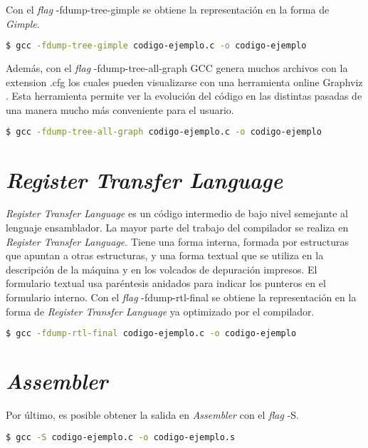 Con el \emph{flag} -fdump-tree-gimple se obtiene la representación en la forma de \emph{Gimple}.

\begin{lstlisting}[label=comandoC, caption= Comando de compilación para obtener codigo-ejemplo.c.006t.gimple \cite{repositorio} para GCC., language=bash]
    $ gcc -fdump-tree-gimple codigo-ejemplo.c -o codigo-ejemplo  \end{lstlisting}

Además, con el \emph{flag} -fdump-tree-all-graph GCC genera muchos archivos con la extension .cfg 
los cuales pueden visualizarse con una herramienta online Graphviz \cite{GraphvizOnline}. Esta herramienta permite 
ver la evolución del código en las distintas pasadas de una manera mucho más conveniente 
para el usuario. 

\begin{lstlisting}[label=comandoC, caption= Comando de compilación del archivo codigo-ejemplo.c \cite{repositorio} para GCC., language=bash]
    $ gcc -fdump-tree-all-graph codigo-ejemplo.c -o codigo-ejemplo  \end{lstlisting}


\section{\emph{Register Transfer Language}}

\emph{Register Transfer Language} es un código intermedio de bajo nivel semejante al lenguaje ensamblador.
La mayor parte del trabajo del compilador se realiza en \emph{Register Transfer Language}. Tiene una forma interna, 
formada por estructuras que apuntan a otras estructuras, y una forma textual 
que se utiliza en la descripción de la máquina y en los volcados de depuración 
impresos. El formulario textual usa paréntesis anidados para indicar los punteros en el formulario interno.
Con el \emph{flag} -fdump-rtl-final se obtiene la representación en la forma de \emph{Register Transfer Language} ya optimizado por el compilador.

\begin{lstlisting}[label=comandoC, caption= Comando de compilación para obtener codigo-ejemplo.c.330r.final \cite{repositorio} para GCC., language=bash]
    $ gcc -fdump-rtl-final codigo-ejemplo.c -o codigo-ejemplo  \end{lstlisting}

\section{\emph{Assembler}}
Por último, es posible obtener la salida en \emph{Assembler} con el \emph{flag} -S.

\begin{lstlisting}[label=comandoC, caption= Comando de compilación para obtener codigo-ejemplo.s \cite{repositorio} para GCC., language=bash]
    $ gcc -S codigo-ejemplo.c -o codigo-ejemplo.s  \end{lstlisting}



